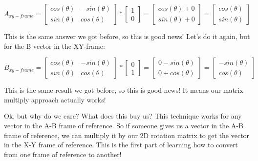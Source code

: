 \documentclass[11pt]{article}
\begin{document}
\begin{equation}
    A_{xy-frame}=
    \begin{bmatrix} 
        cos(\theta) & -sin(\theta) \\
        sin(\theta) & cos(\theta) 
        \end{bmatrix}
    *
    \begin{bmatrix} 
        1 \\ 
        0 
    \end{bmatrix} = 
    \begin{bmatrix} 
        cos(\theta) + 0 \\
        sin(\theta) + 0 
    \end{bmatrix} 
    = 
    \begin{bmatrix} 
        cos(\theta) \\
        sin(\theta)
    \end{bmatrix}
    \end{equation}

This is the same answer we got before, so this is good news!
Let’s do it again, but for the B vector in the XY-frame:

\begin{equation}
    B_{xy-frame}=
    \begin{bmatrix} 
        cos(\theta) & -sin(\theta) \\
        sin(\theta) & cos(\theta) 
        \end{bmatrix}
    *
    \begin{bmatrix} 
        0 \\ 
        1 
    \end{bmatrix}
    = 
    \begin{bmatrix} 
        0 - sin(\theta) \\
        0 + cos(\theta)
    \end{bmatrix} 
    = 
    \begin{bmatrix} 
        -sin(\theta) \\
        cos(\theta)
    \end{bmatrix}
\end{equation}

This is the same result we got before, so this is good news!  It means our matrix multiply
approach actually works!

Ok, but why do we care?  What does this buy us?  This technique works for any vector in the A-B 
frame of reference.  So if someone gives us a vector in the A-B frame of reference, we can
multiply it by our 2D rotation matrix to get the vector in the X-Y frame of reference.
This is the first part of learning how to convert from one frame of reference to another!
\end{document}

